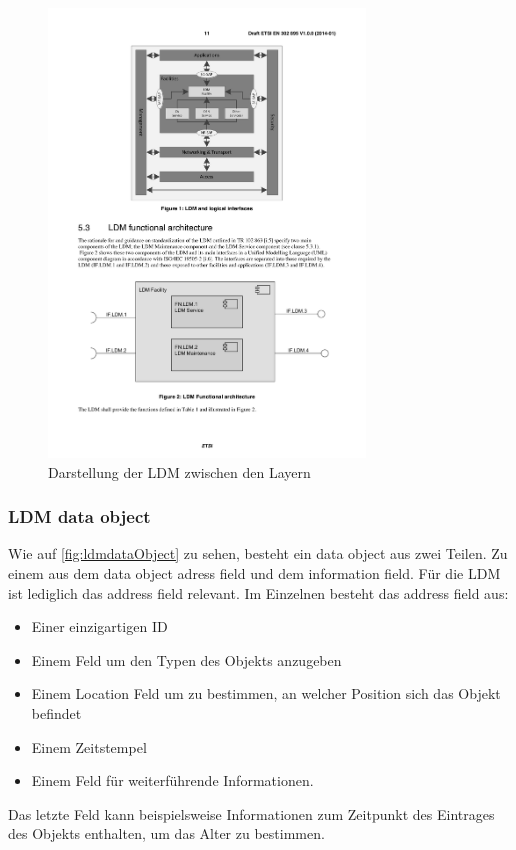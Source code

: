 \begin{figure}[htbp]
	\includegraphics[width=0.75\textwidth]{content/images/04_facilitylayer/ldmLayer.pdf}
	\caption{Darstellung der LDM zwischen den Layern \cite{en302895}}
	\label{fig:ldmZwischenLayern}
\end{figure}

\subsubsection{LDM data object}
Wie auf \autoref{fig:ldmdataObject} zu sehen, besteht ein data object aus zwei Teilen. Zu einem aus dem data object adress field und dem information field. Für die \ac{LDM} ist lediglich das address field relevant. Im Einzelnen besteht das address field aus:
\begin{itemize}
	\item Einer einzigartigen \ac{ID}
	\item Einem Feld um den Typen des Objekts anzugeben
	\item Einem Location Feld um zu bestimmen, an welcher Position sich das Objekt befindet
	\item Einem Zeitstempel
	\item Einem Feld für weiterführende Informationen. 
\end{itemize}	
Das letzte Feld kann beispielsweise Informationen zum Zeitpunkt des Eintrages des Objekts enthalten, um das Alter zu bestimmen.

